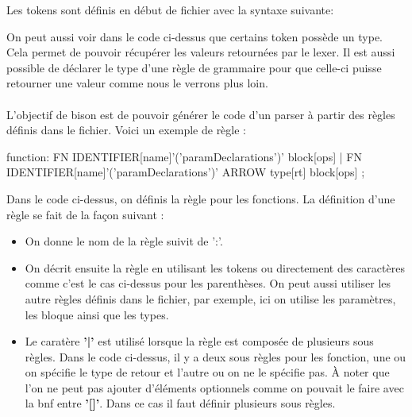 \documentclass[a4paper]{article}%
\begin{document}
Les tokens sont définis en début de fichier avec la syntaxe suivante:

\begin{code}
\end{code}\leavevmode\newline


On peut aussi voir dans le code ci-dessus que certains token possède un type.
Cela permet de pouvoir récupérer les valeurs retournées par le \gls{lexer}. Il est
aussi possible de déclarer le type d'une règle de grammaire pour que celle-ci
puisse retourner une valeur comme nous le verrons plus loin.\\~\\


L'objectif de bison est de pouvoir générer le code d'un \gls{parser} à partir des
règles définis dans le fichier. Voici un exemple de règle :

\begin{code}[language=c++]
function:
        FN IDENTIFIER[name]'('paramDeclarations')' block[ops]
        |
        FN IDENTIFIER[name]'('paramDeclarations')' ARROW type[rt] block[ops]
        ;
\end{code}\leavevmode\newline

Dans le code ci-dessus, on définis la règle pour les fonctions. La définition
d'une règle se fait de la façon suivant :

\begin{itemize}
  \item On donne le nom de la règle suivit de ':'.
  \item On décrit ensuite la règle en utilisant les tokens ou directement des
    caractères comme c'est le cas ci-dessus pour les parenthèses. On peut aussi
    utiliser les autre règles définis dans le fichier, par exemple, ici on
    utilise les paramètres, les bloque ainsi que les types.
  \item Le caratère \textbf{'|'} est utilisé lorsque la règle est composée de
    plusieurs sous règles. Dans le code ci-dessus, il y a deux sous règles pour
    les fonction, une ou on spécifie le type de retour et l'autre ou on ne le
    spécifie pas. À noter que l'on ne peut pas ajouter d'éléments optionnels
    comme on pouvait le faire avec la \gls{bnf} entre \textbf{'[]'}. Dans ce cas
    il faut définir plusieurs sous règles.
\end{itemize}~\\
\end{document}
